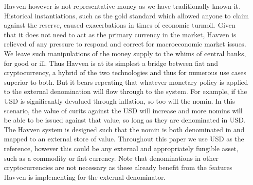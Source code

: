 \noindent Havven however is not representative money as we have traditionally known it. Historical instantiations,
such as the gold standard which allowed anyone to claim against the reserve, caused exacerbations in times of
economic turmoil. Given that it does not need to act as the primary currency in the market, Havven is relieved
of any pressure to respond and correct for macroeconomic market issues. We leave such manipulations of the money
supply to the whims of central banks, for good or ill. Thus Havven is at its simplest a bridge between fiat and
cryptocurrency, a hybrid of the two technologies and thus for numerous use cases superior to both. But it bears
repeating that whatever monetary policy is applied to the external denomination will flow through to the system.
For example, if the USD is significantly devalued through inflation, so too will the nomin. In this scenario,
the value of curits against the USD will increase and more nomins will be able to be issued against that value,
so long as they are denominated in USD. \\

\noindent The Havven system is designed such that the nomin is both denominated in and
mapped to an external store of value. Throughout this paper we use USD as the reference, however this could
be any external and appropriately fungible asset, such as a commodity or fiat currency. Note that denominations
in other cryptocurrencies are not necessary as these already benefit from the features Havven is implementing
for the external denominator. \\

\pagebreak
